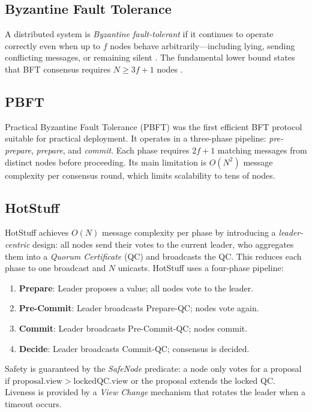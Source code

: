 \documentclass[
12pt,
oneside,
singlespacing,
parskip,
]{article}
\begin{document}
\subsection{Byzantine Fault Tolerance}

A distributed system is \emph{Byzantine fault-tolerant} if it continues to operate correctly even when up to $f$ nodes behave arbitrarily---including lying, sending conflicting messages, or remaining silent \citep{lamport1982byzantine}. The fundamental lower bound states that BFT consensus requires $N \geq 3f + 1$ nodes \citep{fischer1985impossibility}.

\subsection{PBFT}

Practical Byzantine Fault Tolerance (PBFT) \citep{castro1999practical} was the first efficient BFT protocol suitable for practical deployment. It operates in a three-phase pipeline: \emph{pre-prepare}, \emph{prepare}, and \emph{commit}. Each phase requires $2f + 1$ matching messages from distinct nodes before proceeding. Its main limitation is $O(N^2)$ message complexity per consensus round, which limits scalability to tens of nodes.

\subsection{HotStuff}

HotStuff \citep{yin2019hotstuff} achieves $O(N)$ message complexity per phase by introducing a \emph{leader-centric} design: all nodes send their votes to the current leader, who aggregates them into a \emph{Quorum Certificate} (QC) and broadcasts the QC. This reduces each phase to one broadcast and $N$ unicasts. HotStuff uses a four-phase pipeline:

\begin{enumerate}
  \item \textbf{Prepare}: Leader proposes a value; all nodes vote to the leader.
  \item \textbf{Pre-Commit}: Leader broadcasts Prepare-QC; nodes vote again.
  \item \textbf{Commit}: Leader broadcasts Pre-Commit-QC; nodes commit.
  \item \textbf{Decide}: Leader broadcasts Commit-QC; consensus is decided.
\end{enumerate}

Safety is guaranteed by the \emph{SafeNode} predicate: a node only votes for a proposal if $\mathrm{proposal.view} > \mathrm{lockedQC.view}$ or the proposal extends the locked QC. Liveness is provided by a \emph{View Change} mechanism that rotates the leader when a timeout occurs.
\end{document}
